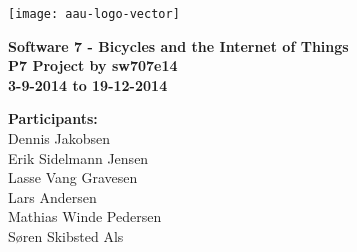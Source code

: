 \thispagestyle{empty} %

\hspace*{-1cm}\parbox[b][\textheight][t]{\textwidth}
{

\begin{center}
	\texttt{[image: aau-logo-vector]}\\
	\vspace{0.25cm}
\end{center} 

\vspace{1cm}
\begin{center}

\textbf{\Huge {Software 7 - Bicycles and the Internet of Things}} \\ \vspace{0.5cm}
\textbf{\Large P7 Project by sw707e14}\\ \vspace{0.5cm}
\textbf{\large 3-9-2014 to 19-12-2014}\\
\end{center}



\vspace{0.25cm}
\begin{center}
\item {\textbf{Participants:}} \\
Dennis Jakobsen\\ Erik Sidelmann Jensen\\ Lasse Vang Gravesen\\ Lars Andersen\\ Mathias Winde Pedersen\\ Søren Skibsted Als\\
\end{center}

\thispagestyle{empty}

\newpage
\thispagestyle{empty}
\mbox{}
}